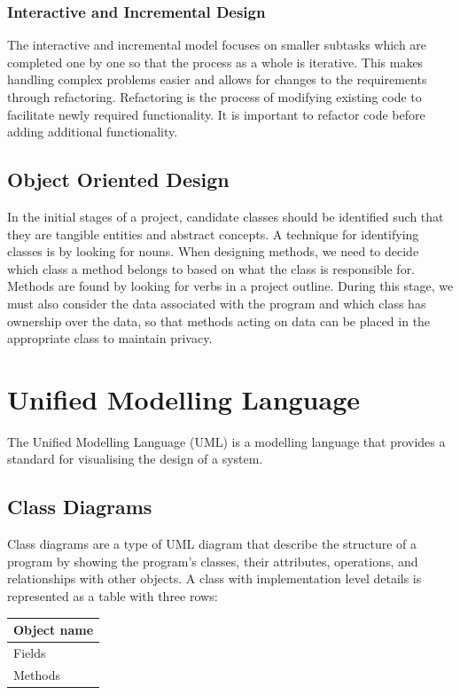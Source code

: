 \documentclass{article}
\begin{document}
\subsubsection{Interactive and Incremental Design}
The interactive and incremental model focuses on smaller subtasks which
are completed one by one so that the process as a whole is iterative.
This makes handling complex problems easier and allows for changes to
the requirements through refactoring. Refactoring is the process of
modifying existing code to facilitate newly required functionality. It
is important to refactor code before adding additional functionality.
\subsection{Object Oriented Design}
In the initial stages of a project, candidate classes should be
identified such that they are tangible entities and abstract concepts.
A technique for identifying classes is by looking for nouns. When
designing methods, we need to decide which class a method belongs to
based on what the class is responsible for. Methods are found by
looking for verbs in a project outline. During this stage, we must also
consider the data associated with the program and which class has
ownership over the data, so that methods acting on data can be placed
in the appropriate class to maintain privacy.
\section{Unified Modelling Language}
The Unified Modelling Language (UML) is a modelling language that
provides a standard for visualising the design of a system.
\subsection{Class Diagrams}
Class diagrams are a type of UML diagram that describe the structure of
a program by showing the program's classes, their attributes,
operations, and relationships with other objects. A class with
implementation level details is represented as a table with three rows:
\begin{table}[H]
    \centering
    \begin{tabular}{|l|} %
        \hline %
        \textbf{Object name} \\
        \hline %
        Fields               \\
        \hline %
        Methods              \\
        \hline %
    \end{tabular}
\end{table}
\end{document}
